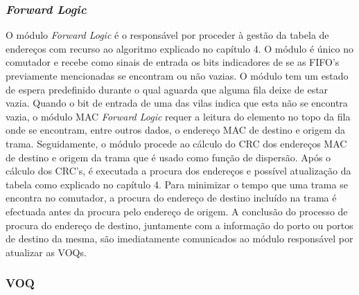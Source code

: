 \subsubsection{\textit{Forward Logic}}

O módulo \textit{Forward Logic} é o responsável por proceder à gestão da tabela de endereços com recurso ao algoritmo explicado no capítulo 4. O módulo é único no comutador e recebe como sinais de entrada os bits indicadores de se as FIFO's previamente mencionadas se encontram ou não vazias. O módulo tem um estado de espera predefinido durante o qual aguarda que alguma fila deixe de estar vazia. Quando o bit de entrada de uma das vilas indica que esta não se encontra vazia, o módulo MAC \textit{Forward Logic} requer a leitura do elemento no topo da fila onde se encontram, entre outros dados, o endereço MAC de destino e origem da trama. Seguidamente, o módulo procede ao cálculo do CRC dos endereços MAC de destino e origem da trama que é usado como função de dispersão. Após o cálculo dos CRC's, é executada a procura dos endereços e possível atualização da tabela como explicado no capítulo 4. Para minimizar o tempo que uma trama se encontra no comutador, a procura do endereço de destino incluído na trama é efectuada antes da procura pelo endereço de origem. A conclusão do processo de procura do endereço de destino, juntamente com a informação do porto ou portos de destino da mesma, são imediatamente comunicados ao módulo responsável por atualizar as VOQs. 

\subsubsection{VOQ}

